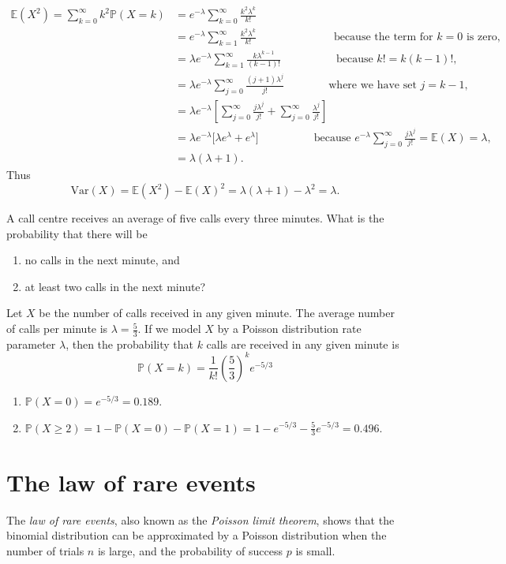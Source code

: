 \documentclass[lecture]{csm}
\newcommand{\prob}{\mathbb{P}}
\newcommand{\expe}{\mathbb{E}}
\newcommand{\var}{\text{Var}}
\def\it{\item}
\def\ben{\begin{enumerate}}
\def\een{\end{enumerate}}
\begin{document}
\newpage
\vspace*{-5ex}
\begin{align*}
\expe(X^2) = \sum_{k=0}^\infty k^2 \prob(X=k)
	& = e^{-\lambda}\sum_{k=0}^\infty \frac{k^2\lambda^k}{k!} \\
	& = e^{-\lambda}\sum_{k=1}^\infty \frac{k^2\lambda^k}{k!} \quad\qquad\qquad\qquad\text{because the term for $k=0$ is zero,}\\
	& = \lambda e^{-\lambda}\sum_{k=1}^\infty \frac{k\lambda^{k-1}}{(k-1)!} \quad\qquad\qquad\text{because $k!=k(k-1)!$,}\\
	& = \lambda e^{-\lambda}\sum_{j=0}^\infty \frac{(j+1)\lambda^j}{j!} \qquad\qquad\text{where we have set $j=k-1$,}\\
	& = \lambda e^{-\lambda}\left[\sum_{j=0}^\infty \frac{j\lambda^j}{j!} + \sum_{j=0}^\infty \frac{\lambda^j}{j!}\right]\\
	& = \lambda e^{-\lambda}\big[\lambda e^{\lambda} + e^{\lambda}\big] \quad\qquad\qquad\text{because $e^{-\lambda}\sum_{j=0}^\infty \frac{j\lambda^j}{j!} = \expe(X) = \lambda$,}\\
	& = \lambda(\lambda+1).
\end{align*}
Thus
\[
\var(X) = \expe(X^2)-\expe(X)^2 = \lambda(\lambda+1)-\lambda^2 = \lambda.
\]

\begin{example}
A call centre receives an average of five calls every three minutes. What is the probability that there will be
\ben
\it no calls in the next minute, and
\it at least two calls in the next minute?
\een
\end{example}
\begin{solution}
Let $X$ be the number of calls received in any given minute. The average number of calls per minute is $\lambda=\frac{5}{3}$. If we model $X$ by a Poisson distribution rate parameter $\lambda$, then the probability that $k$ calls are received in any given minute is
\[
\prob(X=k) = \frac{1}{k!}\left(\frac{5}{3}\right)^ke^{-5/3}
\]
\ben
\it $\prob(X=0) = e^{-5/3} = 0.189$.
\it $\prob(X\geq 2) = 1 - \prob(X=0) - \prob(X=1) = 1 - e^{-5/3} - \displaystyle\frac{5}{3}e^{-5/3} = 0.496$.
\een
\end{solution}

\newpage
\section{The law of rare events}
The \emph{law of rare events}, also known as the \emph{Poisson limit theorem}, shows that the binomial distribution can be approximated by a Poisson distribution when the number of trials $n$ is large, and the probability of success $p$ is small.
\end{document}
